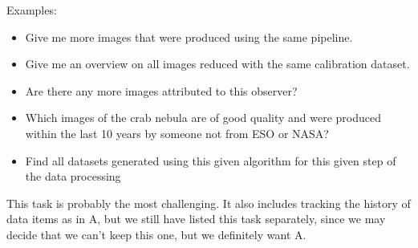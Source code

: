         \noindent Examples:
        \begin{itemize}
            \item Give me more images that were produced using the same pipeline.  
            \item Give me an overview on all images reduced with the same calibration dataset.  
            \item Are there any more images attributed to this observer?  
            \item Which images of the crab nebula are of good quality and were produced within the last 10 years by someone not from ESO or NASA?
            \item Find all datasets generated using this given algorithm for this given step of the data processing
        \end{itemize}

        This task is probably the most challenging. It also includes tracking the history of data items as in A, but we still have listed this task separately, since we may decide that we can't keep this one, but we definitely want A.
